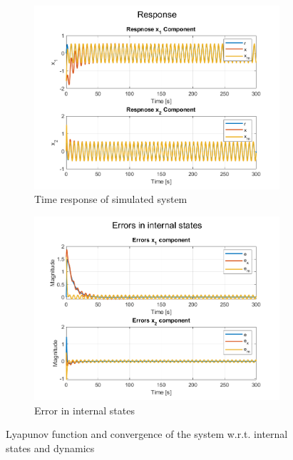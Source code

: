 \begin{figure}[!t]
    \centering
    \begin{subfigure}[b]{0.49\linewidth}
     \centering
     \includegraphics[width=\linewidth]{images/sine/NMRAC_MIMO_Response.png}
     \caption{Time response of simulated system}
     \label{fig:resonse-in-states}
    \end{subfigure}
    \hfill
    \begin{subfigure}[b]{0.49\linewidth}
     \centering
     \includegraphics[width=\linewidth]{images/sine/NMRAC_MIMO_Error.png}
     \caption{Error in internal states}
     \label{fig:error}
    \end{subfigure}
    \caption{Lyapunov function and convergence of the system w.r.t. internal states and dynamics}
    \label{fig:response}
\end{figure}

